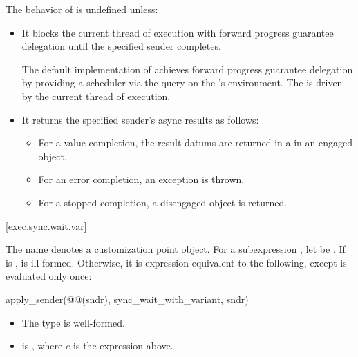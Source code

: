 \pnum
The behavior of  is undefined unless:
\begin{itemize}
\item
It blocks the current thread of execution
with forward progress guarantee delegation
until the specified sender completes.
\begin{note}
The default implementation of  achieves
forward progress guarantee delegation by providing a  scheduler
via the  query
on the 's environment.
The  is driven by the current thread of execution.
\end{note}
\item
It returns the specified sender's async results as follows:
\begin{itemize}
\item
For a value completion,
the result datums are returned in
a  in an engaged  object.
\item
For an error completion, an exception is thrown.
\item
For a stopped completion, a disengaged  object is returned.
\end{itemize}
\end{itemize}

[exec.sync.wait.var]{}

\pnum
The name  denotes
a customization point object.
For a subexpression ,
let  be .
If 
is ,
 is ill-formed.
Otherwise, it is expression-equivalent to the following,
except  is evaluated only once:
\begin{codeblock}
apply_sender(@@(sndr), sync_wait_with_variant, sndr)
\end{codeblock}
\mandates
\begin{itemize}
\item
The type 
is well-formed.
\item
{}
is , where $e$ is the  expression above.
\end{itemize}

